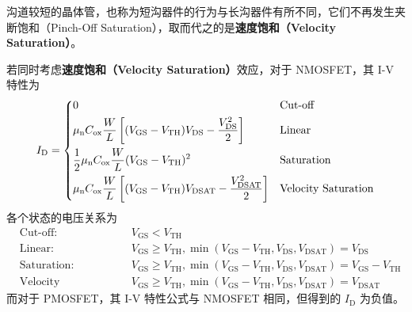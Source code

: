 沟道较短的晶体管，也称为短沟器件的行为与长沟器件有所不同，它们不再发生夹断饱和（Pinch-Off Saturation），取而代之的是\textbf{速度饱和（Velocity Saturation）}。

若同时考虑\textbf{速度饱和（Velocity Saturation）}效应，对于 NMOSFET，其 I-V 特性为
\begin{equation}
    I_{\mathrm{D}} = 
    \begin{dcases}  %
        \begin{aligned}
            & 0 && \text{Cut-off} \\
            & \mu_{\mathrm{n}} C_{\mathrm{ox}} \frac{W}{L} \left[ (V_{\mathrm{GS}} - V_{\mathrm{TH}}) V_{\mathrm{DS}} - \frac{V_{\mathrm{DS}}^2}{2} \right] && \text{Linear} \\
            & \frac{1}{2} \mu_{\mathrm{n}} C_{\mathrm{ox}} \frac{W}{L} (V_{\mathrm{GS}} - V_{\mathrm{TH}})^2 && \text{Saturation} \\
            & \mu_{\mathrm{n}} C_{\mathrm{ox}} \frac{W}{L} \left[ (V_{\mathrm{GS}} - V_{\mathrm{TH}}) V_{\mathrm{DSAT}} - \frac{V_{\mathrm{DSAT}}^2}{2} \right] && \text{Velocity Saturation}
        \end{aligned}
    \end{dcases}
\end{equation}
各个状态的电压关系为
\begin{equation}
    \begin{aligned}
        & \text{Cut-off:} && V_{\mathrm{GS}} < V_{\mathrm{TH}} \\
        & \text{Linear:} && V_{\mathrm{GS}} \geqslant V_{\mathrm{TH}}, \min \left(V_{\mathrm{GS}} - V_{\mathrm{TH}}, V_{\mathrm{DS}}, V_{\mathrm{DSAT}}\right) = V_{\mathrm{DS}} \\
        & \text{Saturation:} && V_{\mathrm{GS}} \geqslant V_{\mathrm{TH}}, \min \left(V_{\mathrm{GS}} - V_{\mathrm{TH}}, V_{\mathrm{DS}}, V_{\mathrm{DSAT}}\right) = V_{\mathrm{GS}} - V_{\mathrm{TH}} \\
        & \text{Velocity Saturation:} && V_{\mathrm{GS}} \geqslant V_{\mathrm{TH}}, \min \left(V_{\mathrm{GS}} - V_{\mathrm{TH}}, V_{\mathrm{DS}}, V_{\mathrm{DSAT}}\right) = V_{\mathrm{DSAT}}
    \end{aligned}
\end{equation}
而对于 PMOSFET，其 I-V 特性公式与 NMOSFET 相同，但得到的 $I_{\mathrm{D}}$ 为负值。

